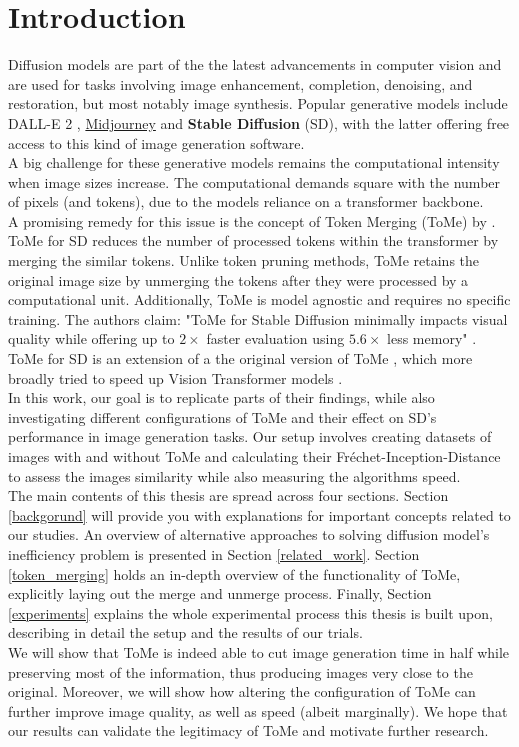 \section{Introduction}
Diffusion models are part of the the latest advancements in computer vision and are used for tasks involving image enhancement, completion, denoising, and restoration, but most notably image synthesis. Popular generative models include DALL-E 2 \cite{ramesh2022hierarchical}, \href{https://www.midjourney.com}{Midjourney} and \textbf{Stable Diffusion} (SD), with the latter offering free access to this kind of image generation software.\\
A big challenge for these generative models remains the computational intensity when image sizes increase. The computational demands square with the number of pixels (and tokens), due to the models reliance on a transformer backbone.\\
A promising remedy for this issue is the concept of Token Merging (ToMe) by \cite{bolya2023tomesd}. ToMe for SD reduces the number of processed tokens within the transformer by merging the similar tokens. Unlike token pruning methods, ToMe retains the original image size by unmerging the tokens after they were processed by a computational unit. Additionally, ToMe is model agnostic and requires no specific training. The authors claim: "ToMe for Stable Diffusion minimally impacts visual quality while offering up to $2 \times$ faster evaluation using $5.6 \times$ less memory" \cite{bolya2023tomesd}. ToMe for SD is an extension of a the original version of ToMe \cite{bolya2023tome}, which more broadly tried to speed up Vision Transformer models \cite{dosovitskiy2020image}.\\
In this work, our goal is to replicate parts of their findings, while also investigating different configurations of ToMe and their effect on SD's performance in image generation tasks. Our setup involves creating datasets of images with and without ToMe and calculating their Fréchet-Inception-Distance to assess the images similarity while also measuring the algorithms speed.\\
The main contents of this thesis are spread across four sections. Section \ref{backgorund} will provide you with explanations for important concepts related to our studies. An overview of alternative approaches to solving diffusion model's inefficiency problem is presented in Section \ref{related_work}. Section \ref{token_merging} holds an in-depth overview of the functionality of ToMe, explicitly laying out the merge and unmerge process. Finally, Section \ref{experiments} explains the whole experimental process this thesis is built upon, describing in detail the setup and the results of our trials.\\
We will show that ToMe is indeed able to cut image generation time in half while preserving most of the information, thus producing images very close to the original. Moreover, we will show how altering the configuration of ToMe can further improve image quality, as well as speed (albeit marginally). We hope that our results can validate the legitimacy of ToMe and motivate further research.\\


